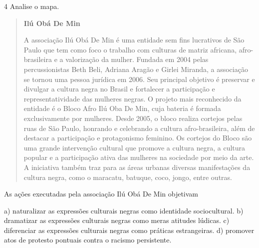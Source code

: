 \num{4} Analise o mapa.

\begin{quote}
\textbf{Ilú Obá De Min}

A associação Ilú Obá De Min é uma entidade sem fins lucrativos de São Paulo que tem como foco o trabalho com culturas de matriz africana, afro-brasileira e a valorização da mulher. Fundada em 2004 pelas percussionistas Beth Beli, Adriana Aragão e Girlei Miranda, a associação se tornou uma pessoa jurídica em 2006. Seu principal objetivo é preservar e divulgar a cultura negra no Brasil e fortalecer a participação e representatividade das mulheres negras. O projeto mais reconhecido da entidade é o Bloco Afro Ilú Oba De Min, cuja bateria é formada exclusivamente por mulheres. Desde 2005, o bloco realiza cortejos pelas ruas de São Paulo, honrando e celebrando a cultura afro-brasileira, além de destacar a participação e protagonismo feminino. Os cortejos do Bloco são uma grande intervenção cultural que promove a cultura negra, a cultura popular e a participação ativa das mulheres na sociedade por meio da arte. A iniciativa também traz para as áreas urbanas diversas manifestações da cultura negra, como o maracatu, batuque, coco, jongo, entre outras.

\end{quote}

As ações executadas pela associação Ilú Obá De Min objetivam

a)  naturalizar as expressões culturais negras como identidade
    sociocultural.
b)  dramatizar as expressões culturais negras como meras atitudes
    lúdicas.
c)  diferenciar as expressões culturais negras como práticas
    estrangeiras.
d)  promover atos de protesto pontuais contra o racismo persistente.


